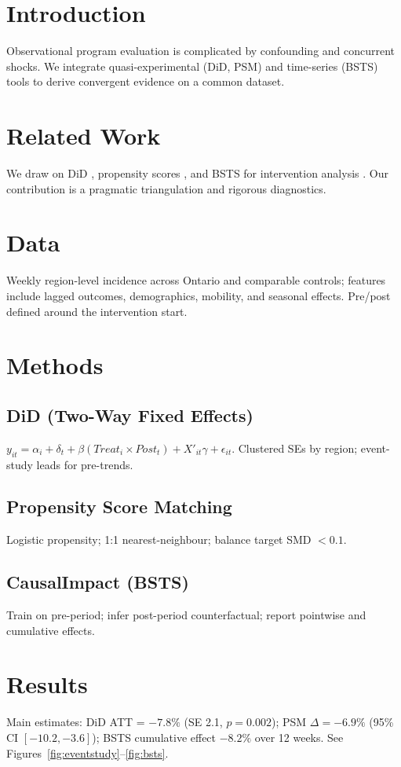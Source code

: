 \documentclass[10pt]{article}
\begin{document}
\begin{multicols}{2}

\section{Introduction}
Observational program evaluation is complicated by confounding and concurrent shocks. We integrate quasi-experimental (DiD, PSM) and time-series (BSTS) tools to derive convergent evidence on a common dataset.

\section{Related Work}
We draw on DiD \cite{card1994}, propensity scores \cite{rosenbaum1983}, and BSTS for intervention analysis \cite{brodersen2015}. Our contribution is a pragmatic triangulation and rigorous diagnostics.

\section{Data}
Weekly region-level incidence across Ontario and comparable controls; features include lagged outcomes, demographics, mobility, and seasonal effects. Pre/post defined around the intervention start.

\section{Methods}
\subsection{DiD (Two-Way Fixed Effects)}
\(y_{it} = \alpha_i + \delta_t + \beta (Treat_i \times Post_t) + X'_{it}\gamma + \epsilon_{it}\). Clustered SEs by region; event-study leads for pre-trends.

\subsection{Propensity Score Matching}
Logistic propensity; 1:1 nearest-neighbour; balance target SMD $< 0.1$.

\subsection{CausalImpact (BSTS)}
Train on pre-period; infer post-period counterfactual; report pointwise and cumulative effects.

\section{Results}
Main estimates: DiD ATT = \(-7.8\%\) (SE 2.1, \(p=0.002\)); PSM $\Delta=-6.9\%$ (95\% CI \([-10.2,-3.6]\)); BSTS cumulative effect \(-8.2\%\) over 12 weeks. See Figures~\ref{fig:eventstudy}--\ref{fig:bsts}.


\end{multicols}
\end{document}
